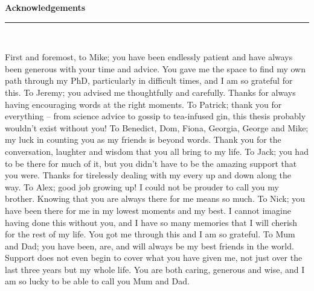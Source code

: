 \thispagestyle{empty}
\begin{raggedleft}
\vspace*{23mm}
\hfill {\huge {\bf {Acknowledgements}}} \\
\vspace{6mm}
\hfill \rule{4in}{.015in} \\
\vspace{19mm}
\end{raggedleft}


First and foremost, to Mike;  you have been endlessly patient and have always been generous with your time and advice.  You gave me the  space to find my own path through my PhD, particularly in difficult times, and I am so grateful for this.  
To Jeremy; %
you advised me thoughtfully and carefully. Thanks for always having  encouraging words at the right moments.
To Patrick; %
thank you for everything -- %
from science advice to gossip to tea-infused gin, this thesis probably wouldn't exist without you!
To 
Benedict,
Dom,
Fiona,
Georgia,
George
and
Mike;  my luck in counting you as my friends is beyond words. %
Thank you for the
conversation, laughter and wisdom that you all bring to my life.  
To Jack; you had to be there for much of it, but you didn't have to be the amazing support that you were.  Thanks for tirelessly dealing with my every up and down along the way.  To Alex;  good job growing up! I could not be prouder to call you my brother.  Knowing that you are always there for me means so much. 
%
To Nick; you have been there for me in my lowest moments and my best.  
I cannot imagine having done this without you, and I have so many memories that I will cherish for the rest of my life.  
You got me through this 
and I am so grateful.
To Mum and Dad;  you have been, are, and will always be my best friends in the world.  Support does not even begin to cover what you have given me, not just over the last three years but my whole life.  You are both caring, generous and wise, and I am so lucky to be able to call you Mum and Dad.  
\bigskip

